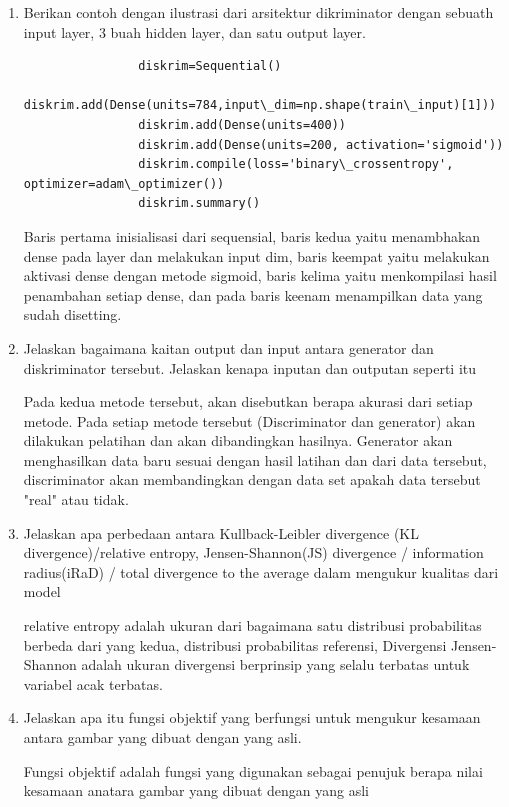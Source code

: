 \begin{enumerate}
            \item Berikan contoh dengan ilustrasi dari arsitektur dikriminator dengan sebuath input layer, 3 buah hidden layer, dan satu output layer.
                \begin{verbatim}
                diskrim=Sequential()
                diskrim.add(Dense(units=784,input\_dim=np.shape(train\_input)[1]))
                diskrim.add(Dense(units=400)) 
                diskrim.add(Dense(units=200, activation='sigmoid')) 
                diskrim.compile(loss='binary\_crossentropy', optimizer=adam\_optimizer())
                diskrim.summary()
                \end{verbatim}
            \par Baris pertama inisialisasi dari sequensial, baris kedua yaitu menambhakan dense pada layer dan melakukan input dim, baris keempat yaitu melakukan aktivasi dense dengan metode sigmoid, baris kelima yaitu menkompilasi hasil penambahan setiap dense, dan pada baris keenam menampilkan data yang sudah disetting. 
            
            \item Jelaskan bagaimana kaitan output dan input antara generator dan diskriminator tersebut. Jelaskan kenapa inputan dan outputan seperti itu
            \par Pada kedua metode tersebut, akan disebutkan berapa akurasi dari setiap metode. Pada setiap metode tersebut (Discriminator dan generator) akan dilakukan pelatihan dan akan dibandingkan hasilnya. Generator akan menghasilkan data baru sesuai dengan hasil latihan dan dari data tersebut, discriminator akan membandingkan dengan data set apakah data tersebut "real" atau tidak.
            
            \item Jelaskan apa perbedaan antara Kullback-Leibler divergence (KL divergence)/relative entropy, Jensen-Shannon(JS) divergence / information radius(iRaD) / total divergence to the average dalam mengukur kualitas dari model
            \par relative entropy adalah ukuran dari bagaimana satu distribusi probabilitas berbeda dari yang kedua, distribusi probabilitas referensi, Divergensi Jensen-Shannon adalah ukuran divergensi berprinsip yang selalu terbatas untuk variabel acak terbatas.

            \item Jelaskan apa itu fungsi objektif yang berfungsi untuk mengukur kesamaan antara gambar yang dibuat dengan yang asli.
            \par Fungsi objektif adalah fungsi yang digunakan sebagai penujuk berapa nilai kesamaan anatara gambar yang dibuat dengan yang asli


\end{enumerate}
